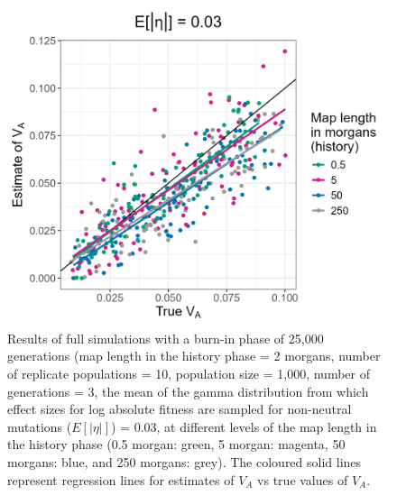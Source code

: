 \documentclass[12pt]{article}
\begin{document}
\begin{bibunit}
\begin{figure}[H]
\centering
\includegraphics[scale = 0.15]{Figures/full_ml_eta0.045.jpg}
\caption{Results of full simulations with a burn-in phase of 25,000 generations (map length in the history phase = 2 morgans, number of replicate populations = 10, population size = 1,000, number of generations = 3, the mean of the gamma distribution from which effect sizes for log absolute fitness are sampled for non-neutral mutations ($E[|\eta|]$) = 0.03, at different levels of the map length in the history phase (0.5 morgan: green, 5 morgan: magenta, 50 morgans: blue, and 250 morgans: grey). The coloured solid lines represent regression lines for estimates of $V_A$ vs true values of $V_A$.}
  \label{fig:full_ml_eta0.045}
\end{figure}



\end{bibunit}
\end{document}
